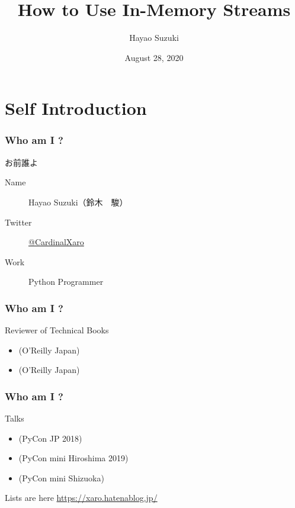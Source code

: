 \documentclass[aspectratio=169,dvipdfmx,14pt,notheorems]{beamer}
\title{How to Use In-Memory Streams}
\author[Hayao]{Hayao Suzuki}
\institute[PyCon JP 2020]{PyCon JP 2020}
\date{August 28, 2020}
\theoremstyle{definition}
\begin{document}
\begin{frame}[plain]\frametitle{}
\titlepage %
\end{frame}

\section{Self Introduction}

\begin{frame}\frametitle{Who am I ?}

\begin{block}{お前誰よ}
\begin{description}
\item[Name] Hayao Suzuki（鈴木　駿）
\item[Twitter] \href{https://twitter.com/CardinalXaro}{@CardinalXaro}
\item[Work] Python Programmer
\end{description}
\end{block}

\end{frame}

\begin{frame}\frametitle{Who am I ?}

\begin{block}{Reviewer of Technical Books}
\begin{itemize}
\item {}(O'Reilly Japan)
\item {}(O'Reilly Japan)
\end{itemize}
\end{block}

\end{frame}

\begin{frame}\frametitle{Who am I ?}

\begin{block}{Talks}
\begin{itemize}
\item {}(PyCon JP 2018)
\item {}(PyCon mini Hiroshima 2019)
\item {}(PyCon mini Shizuoka)
\end{itemize}
\end{block}
Lists are here  \url{https://xaro.hatenablog.jp/}
\end{frame}
\end{document}
